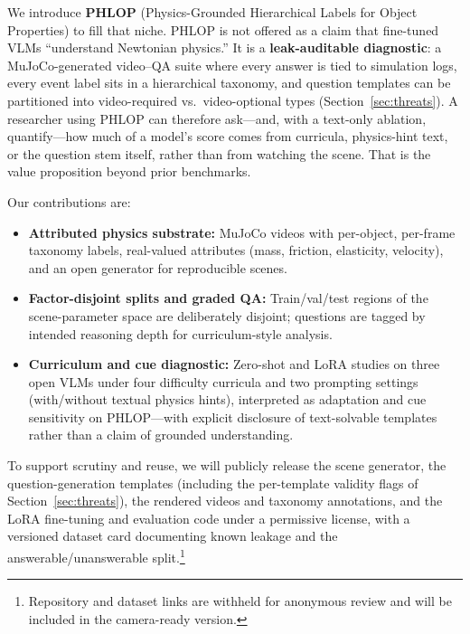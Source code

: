 \documentclass[conference]{IEEEtran}
\begin{document}
We introduce \textbf{PHLOP} (Physics-Grounded Hierarchical Labels for Object Properties) to fill that niche.
PHLOP is not offered as a claim that fine-tuned VLMs ``understand Newtonian physics.''
It is a \textbf{leak-auditable diagnostic}: a MuJoCo-generated video--QA suite where every answer is tied to simulation logs, every event label sits in a hierarchical taxonomy, and question templates can be partitioned into video-required vs.\ video-optional types (Section~\ref{sec:threats}).
A researcher using PHLOP can therefore ask---and, with a text-only ablation, quantify---how much of a model's score comes from curricula, physics-hint text, or the question stem itself, rather than from watching the scene.
That is the value proposition beyond prior benchmarks.

Our contributions are:
\begin{itemize}

\item \textbf{Attributed physics substrate:} MuJoCo videos with per-object, per-frame taxonomy labels, real-valued attributes (mass, friction, elasticity, velocity), and an open generator for reproducible scenes.

\item \textbf{Factor-disjoint splits and graded QA:} Train/val/test regions of the scene-parameter space are deliberately disjoint; questions are tagged by intended reasoning depth for curriculum-style analysis.

\item \textbf{Curriculum and cue diagnostic:} Zero-shot and LoRA studies on three open VLMs under four difficulty curricula and two prompting settings (with/without textual physics hints), interpreted as adaptation and cue sensitivity on PHLOP---with explicit disclosure of text-solvable templates rather than a claim of grounded understanding.

\end{itemize}

To support scrutiny and reuse, we will publicly release the scene generator, the question-generation templates (including the per-template validity flags of Section~\ref{sec:threats}), the rendered videos and taxonomy annotations, and the LoRA fine-tuning and evaluation code under a permissive license, with a versioned dataset card documenting known leakage and the answerable/unanswerable split.\footnote{Repository and dataset links are withheld for anonymous review and will be included in the camera-ready version.}
\end{document}
